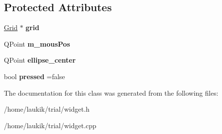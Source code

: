 \subsection*{Protected Attributes}
\begin{DoxyCompactItemize}
\item 
\mbox{\label{classWidget_a9b23cd60d048608bf2c0171471a73ec4}} 
\hyperlink{classGrid}{Grid} $\ast$ {\bfseries grid}
\item 
\mbox{\label{classWidget_adb0ad85b6b37e66f3705e92b8a5fbf2e}} 
Q\+Point {\bfseries m\+\_\+mous\+Pos}
\item 
\mbox{\label{classWidget_a0a9df061d31e20b7554a6700d199e673}} 
Q\+Point {\bfseries ellipse\+\_\+center}
\item 
\mbox{\label{classWidget_a5e418cc4352caeb32b5e66a256ae56e0}} 
bool {\bfseries pressed} =false
\end{DoxyCompactItemize}


The documentation for this class was generated from the following files\+:\begin{DoxyCompactItemize}
\item 
/home/laukik/trial/widget.\+h\item 
/home/laukik/trial/widget.\+cpp\end{DoxyCompactItemize}
